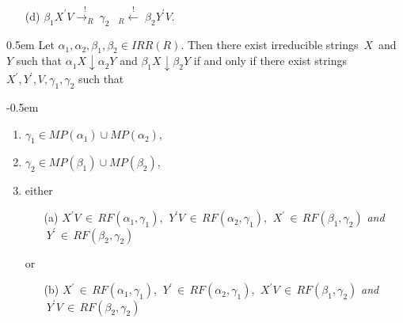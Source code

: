 \documentclass{lmcs} %
\theoremstyle{plain}\newtheorem{satz}[thm]{Satz} %
\begin{document}
\begin{appendices}
\begin{cor}
\begin{enumerate}
\begin{itemize}
  \item[(d)] $\beta_1^{} X^{\prime} V \stackrel{!}{{\longrightarrow}_{R}^{}} ~ \gamma_2^{} \; \; ~ {}_R^{}{\!{\stackrel{!}{\longleftarrow}}} \;
  \beta_2^{} Y^{\prime} V$.
  \end{itemize}

\end{enumerate}
\end{cor}


\begin{lem}{\label{CEOneMappingMonadicLemma4}}
\openup 0.5em
  Let $\alpha_1^{}, \alpha_2^{}, \beta_1^{} , \beta_2^{} \in
  IRR(R)$. Then there exist irreducible strings~$X$~and~$Y$ such that
  $\alpha_1^{} X \downarrow \alpha_2^{} Y$ and $\beta_1^{} X
  \downarrow \beta_2^{} Y$ if and only if there exist
  strings~$X^{\prime}, Y^{\prime}, V, \gamma_1^{}, \gamma_2^{}$
  such that

\openup -0.5em
\begin{enumerate}

\item $\gamma_1^{} \in MP(\alpha_1^{}) \cup MP(\alpha_2^{})$,

\item $\gamma_2^{} \in MP(\beta_1^{}) \cup MP(\beta_2^{})$,

\item either \begin{itemize}
  
  \item[(a)] $X^{\prime} V \, \in \, RF(\alpha_1, \gamma_1^{}) $, $~ Y^{\prime} V \, \in \, RF(\alpha_2, \gamma_1^{}) $, 
             $~ X^{\prime} \, \in \, RF(\beta_1, \gamma_2^{})$ \emph{and} $~ Y^{\prime} \, \in \, RF(\beta_2, \gamma_2^{})$
  
\end{itemize} or \begin{itemize}

  \item[(b)] $X^{\prime} \, \in \, RF(\alpha_1, \gamma_1^{}) $, $~ Y^{\prime} \, \in \, RF(\alpha_2, \gamma_1^{}) $, 
             $~ X^{\prime} V  \, \in \, RF(\beta_1, \gamma_2^{})$ \emph{and} $~ Y^{\prime} V \, \in \, RF(\beta_2, \gamma_2^{})$

\end{itemize}

\end{enumerate}

\end{lem}



\end{appendices}
\end{document}
